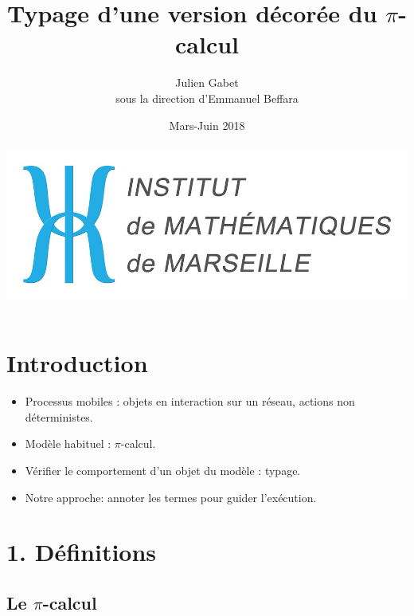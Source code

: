 \documentclass[11pt]{beamer}
\author{Julien Gabet\\
sous la direction d'Emmanuel Beffara}
\title{Typage d'une version décorée du $\pi$-calcul}
\institute{Institut de Mathématiques de Marseille}
\date{Mars-Juin 2018\\~\\
\includegraphics[scale=0.1]{institutMathMarseille.jpg}}
\begin{document}
\begin{frame}
\titlepage
\end{frame}


\begin{frame}
\tableofcontents
\end{frame}

\section{Introduction}

\begin{frame}
\begin{itemize}
\item Processus mobiles : objets en interaction sur un réseau, actions non déterministes.
\item Modèle habituel : $\pi$-calcul.
\item Vérifier le comportement d'un objet du modèle : typage.
\item Notre approche: annoter les termes pour guider l'exécution.
\end{itemize}
\end{frame}

\section{1. Définitions}
\subsection{Le $\pi$-calcul}
\end{document}
